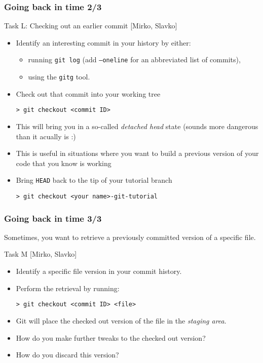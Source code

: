 \begin{frame}[fragile]

\frametitle{Going back in time 2/3}

\begin{block}{Task L: Checking out an earlier commit [Mirko, Slavko]}
	\begin{itemize}
	\item Identify an interesting commit in your history by either:
	\begin{itemize}
	\item running \texttt{git log} (add \texttt{--oneline} for an abbreviated list of commits),
	\item using the \texttt{gitg} tool. 
	\end{itemize}
	\item Check out that commit into your working tree
	\begin{verbatim}
> git checkout <commit ID>
	\end{verbatim}
	\item This will bring you in a so-called \emph{detached head} state (sounds more dangerous than it acually is :)
	\item This is useful in situations where you want to build a previous version of your code that you know is working
	\item Bring \texttt{HEAD} back to the tip of your tutorial branch
	\begin{verbatim}
> git checkout <your name>-git-tutorial
	\end{verbatim}
	\end{itemize}
\end{block}

\end{frame}


\begin{frame}[fragile]

\frametitle{Going back in time 3/3}

Sometimes, you want to retrieve a previously committed version of a specific file.

	\begin{block}{Task M [Mirko, Slavko]}
	\begin{itemize}	
	\item Identify a specific file version in your commit history.
	\item Perform the retrieval by running:
	\begin{verbatim}
> git checkout <commit ID> <file>
	\end{verbatim}
	\item Git will place the checked out version of the file in the \emph{staging area}.
	\item How do you make further tweaks to the checked out version?
	\item How do you discard this version?
	\end{itemize}	
	
	\end{block}
\end{frame}

